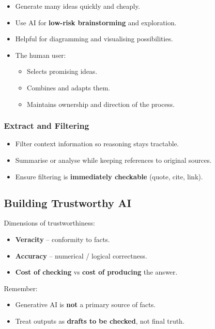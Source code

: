 \documentclass[
  letterpaper,
  DIV=11,
  numbers=noendperiod]{scrreprt}
\providecommand{\tightlist}{%
  \setlength{\itemsep}{0pt}\setlength{\parskip}{0pt}}
\begin{document}
\begin{itemize}
\tightlist
\item
  Generate many ideas quickly and cheaply.
\item
  Use AI for \textbf{low-risk brainstorming} and exploration.
\item
  Helpful for diagramming and visualising possibilities.
\item
  The human user:

  \begin{itemize}
  \tightlist
  \item
    Selects promising ideas.
  \item
    Combines and adapts them.
  \item
    Maintains ownership and direction of the process.
  \end{itemize}
\end{itemize}

\subsubsection{Extract and Filtering}\label{extract-and-filtering}

\begin{itemize}
\tightlist
\item
  Filter context information so reasoning stays tractable.
\item
  Summarise or analyse while keeping references to original sources.
\item
  Ensure filtering is \textbf{immediately checkable} (quote, cite,
  link).
\end{itemize}

\subsection{Building Trustworthy AI}\label{building-trustworthy-ai}

Dimensions of trustworthiness:

\begin{itemize}
\tightlist
\item
  \textbf{Veracity} -- conformity to facts.
\item
  \textbf{Accuracy} -- numerical / logical correctness.
\item
  \textbf{Cost of checking} vs \textbf{cost of producing} the answer.
\end{itemize}

Remember:

\begin{itemize}
\tightlist
\item
  Generative AI is \textbf{not} a primary source of facts.
\item
  Treat outputs as \textbf{drafts to be checked}, not final truth.
\end{itemize}
\end{document}

